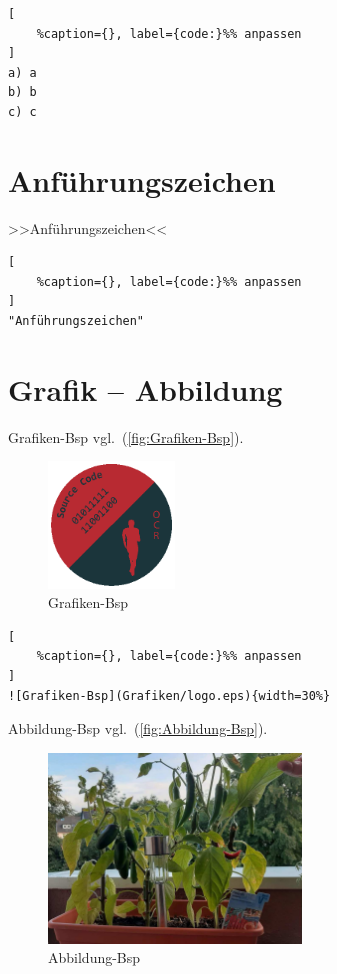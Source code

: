 \lstset{language=C}%
\begin{lstlisting}[
	%caption={}, label={code:}%% anpassen
]
a) a
b) b
c) c
\end{lstlisting}

\section{Anführungszeichen}\label{anfuehrungszeichen}

>>Anführungszeichen<<

\lstset{language=C}%
\begin{lstlisting}[
	%caption={}, label={code:}%% anpassen
]
"Anführungszeichen" 
\end{lstlisting}

\section{Grafik -- Abbildung}\label{grafik-abbildung}

Grafiken-Bsp vgl.~(\autoref{fig:Grafiken-Bsp}).

\begin{figure}[!hb]%
\centering
\includegraphics[width=0.3\textwidth]{Grafiken/logo.eps}
\caption{Grafiken-Bsp}
\label{fig:Grafiken-Bsp}%
\end{figure}

\lstset{language=C}%
\begin{lstlisting}[
	%caption={}, label={code:}%% anpassen
]
![Grafiken-Bsp](Grafiken/logo.eps){width=30%}
\end{lstlisting}

Abbildung-Bsp vgl.~(\autoref{fig:Abbildung-Bsp}).

\begin{figure}[!hb]%
\centering
\includegraphics[width=0.6\textwidth]{images/Chili-1.pdf}
\caption{Abbildung-Bsp}
\label{fig:Abbildung-Bsp}%
\end{figure}

